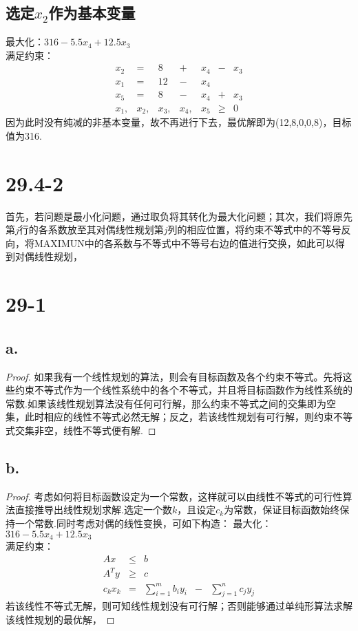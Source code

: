\documentclass[twocolumn]{article}
\newenvironment{SChinese}{%
	\CJKfamily{gbsn}%
	\CJKtilde
	\CJKnospace}{}
\begin{document}
\begin{CJK}{UTF8}{}
\begin{SChinese}
				\subsection*{选定$x_2$作为基本变量}
				最大化：$316-5.5x_4+12.5x_3$\\
				满足约束：\begin{displaymath}
				\begin{matrix}
				x_2 & = & 8 & + & x_4 & - & x_3 \\
				x_1 & = & 12 & - & x_4 &   &    \\
				x_5 & = & 8 & - & x_4 & + & x_3 \\
				x_1, & x_2, & x_3, & x_4, & x_5 & \ge & 0
				\end{matrix}
				\end{displaymath}
				因为此时没有纯减的非基本变量，故不再进行下去，最优解即为(12,8,0,0,8)，目标值为316.
			\section*{29.4-2}
				首先，若问题是最小化问题，通过取负将其转化为最大化问题；其次，我们将原先第$j$行的各系数放至其对偶线性规划第$j$列的相应位置，将约束不等式中的不等号反向，将MAXIMUN中的各系数与不等式中不等号右边的值进行交换，如此可以得到对偶线性规划，
			\section*{29-1}
				\subsection*{a.}
					\begin{proof}
						如果我有一个线性规划的算法，则会有目标函数及各个约束不等式。先将这些约束不等式作为一个线性系统中的各个不等式，并且将目标函数作为线性系统的常数.如果该线性规划算法没有任何可行解，那么约束不等式之间的交集即为空集，此时相应的线性不等式必然无解；反之，若该线性规划有可行解，则约束不等式交集非空，线性不等式便有解.
					\end{proof}
				\subsection*{b.}
					\begin{proof}
						考虑如何将目标函数设定为一个常数，这样就可以由线性不等式的可行性算法直接推导出线性规划求解.选定一个数$k$，且设定$c_k$为常数，保证目标函数始终保持一个常数.同时考虑对偶的线性变换，可如下构造：
						最大化：$316-5.5x_4+12.5x_3$\\
						满足约束：\begin{displaymath}
						\begin{matrix}
						Ax & \le & b &  &  \\
						A^Ty & \ge & c  &  &  \\
						c_kx_k & = & \sum_{i=1}^{m}b_iy_i & - & \sum_{j=1}^{n}c_jy_j  
						\end{matrix}
						\end{displaymath}
						若该线性不等式无解，则可知线性规划没有可行解；否则能够通过单纯形算法求解该线性规划的最优解，
					\end{proof}
		\end{SChinese}
	\end{CJK}
\end{document}
